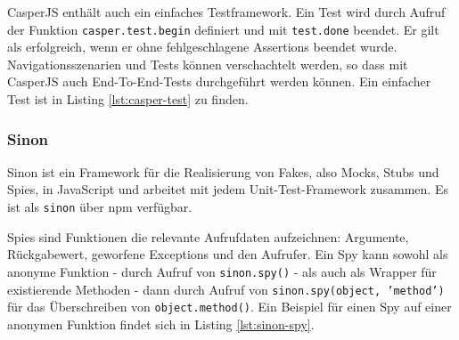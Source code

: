 \begin{figure}[H]
	
\end{figure}

CasperJS enthält auch ein einfaches Testframework. Ein Test wird durch Aufruf der Funktion \texttt{casper.test.begin} definiert und mit \texttt{test.done} beendet. Er gilt als erfolgreich, wenn er ohne fehlgeschlagene Assertions beendet wurde. Navigationsszenarien und Tests können verschachtelt werden, so dass mit CasperJS auch End-To-End-Tests durchgeführt werden können. \cite{casperjs-index, casperjs-test} Ein einfacher Test ist in Listing \ref{lst:casper-test} zu finden.

\begin{figure}[H]
	
\end{figure}


\subsubsection{Sinon}
\label{sec:Sinon}
Sinon ist ein Framework für die Realisierung von Fakes, also Mocks, Stubs und Spies, in JavaScript und arbeitet mit jedem Unit-Test-Framework zusammen. Es ist als \texttt{sinon} über npm verfügbar. \cite{sinonjs-index}

Spies sind Funktionen die relevante Aufrufdaten aufzeichnen: Argumente, Rückgabewert, geworfene Exceptions und den Aufrufer. Ein Spy kann sowohl als anonyme Funktion - durch Aufruf von \texttt{sinon.spy()} - als auch als Wrapper für existierende Methoden - dann durch Aufruf von \texttt{sinon.spy(object, 'method')} für das Überschreiben von \texttt{object.method()}. \cite{sinonjs-spies} Ein Beispiel für einen Spy auf einer anonymen Funktion findet sich in Listing \ref{lst:sinon-spy}.

\begin{figure}[H]
	
\end{figure}

